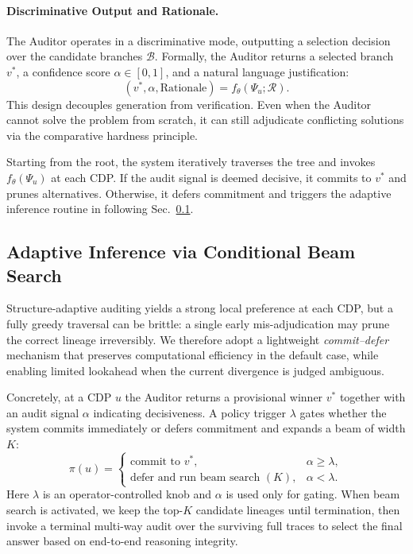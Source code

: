 \documentclass{article}
\theoremstyle{plain}
\theoremstyle{definition}
\theoremstyle{remark}
\begin{document}
\paragraph{Discriminative Output and Rationale.}
The Auditor operates in a discriminative mode, outputting a selection decision over the candidate branches $\mathcal{B}$. Formally, the Auditor returns a selected branch $v^*$, a confidence score $\alpha \in [0,1]$, and a natural language justification:
\begin{equation}
    (v^*, \alpha, \text{Rationale}) = f_{\theta}(\Psi_u; \mathcal{R}).
\end{equation}
This design decouples generation from verification. Even when the Auditor cannot solve the problem from scratch, it can still adjudicate conflicting solutions via the comparative hardness principle. 

Starting from the root, the system iteratively traverses the tree and invokes $f_\theta(\Psi_u)$ at each CDP. If the audit signal is deemed decisive, it commits to $v^*$ and prunes alternatives. Otherwise, it defers commitment and triggers the adaptive inference routine in following Sec.~\ref{sec:inference}. 



\subsection{Adaptive Inference via Conditional Beam Search}
\label{sec:inference}

Structure-adaptive auditing yields a strong local preference at each CDP, but a fully greedy traversal can be brittle: a single early mis-adjudication may prune the correct lineage irreversibly. We therefore adopt a lightweight \emph{commit--defer} mechanism that preserves computational efficiency in the default case, while enabling limited lookahead when the current divergence is judged ambiguous.

Concretely, at a CDP $u$ the Auditor returns a provisional winner $v^*$ together with an audit signal $\alpha$ indicating decisiveness. A policy trigger $\lambda$ gates whether the system commits immediately or defers commitment and expands a beam of width $K$:
\begin{equation}
\pi(u)=
\begin{cases}
\text{commit to } v^*, & \alpha \ge \lambda,\\
\text{defer and run beam search }(K), & \alpha < \lambda.
\end{cases}
\end{equation}
Here $\lambda$ is an operator-controlled knob and $\alpha$ is used only for gating. When beam search is activated, we keep the top-$K$ candidate lineages until termination, then invoke a terminal multi-way audit over the surviving full traces to select the final answer based on end-to-end reasoning integrity.
\end{document}
